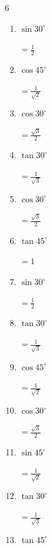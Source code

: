 \begin{multicols}{6}
\begin{enumerate}
\columnbreak %

  \item $\displaystyle \sin{30^\circ}$

        $\displaystyle =\frac{1}{2}$

  \item $\displaystyle \cos{45^\circ}$

        $\displaystyle =\frac{1}{\sqrt{2}}$

  \item $\displaystyle \cos{30^\circ}$

        $\displaystyle =\frac{\sqrt{3}}{2}$

  \item $\displaystyle \tan{30^\circ}$

        $\displaystyle =\frac{1}{\sqrt{3}}$

  \item $\displaystyle \cos{30^\circ}$

        $\displaystyle =\frac{\sqrt{3}}{2}$

  \item $\displaystyle \tan{45^\circ}$

        $\displaystyle =1$

  \item $\displaystyle \sin{30^\circ}$

        $\displaystyle =\frac{1}{2}$

  \item $\displaystyle \tan{30^\circ}$

        $\displaystyle =\frac{1}{\sqrt{3}}$

  \item $\displaystyle \cos{45^\circ}$

        $\displaystyle =\frac{1}{\sqrt{2}}$

  \item $\displaystyle \cos{30^\circ}$

        $\displaystyle =\frac{\sqrt{3}}{2}$

  \item $\displaystyle \sin{45^\circ}$

        $\displaystyle =\frac{1}{\sqrt{2}}$

  \item $\displaystyle \tan{30^\circ}$

        $\displaystyle =\frac{1}{\sqrt{3}}$

  \item $\displaystyle \tan{45^\circ}$


\end{enumerate}
\end{multicols}
